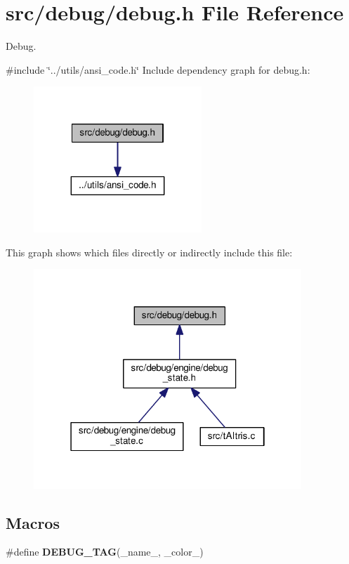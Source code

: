 \section{src/debug/debug.h File Reference}
\label{debug_8h}


Debug.  


{\ttfamily \#include \char`\"{}../utils/ansi\+\_\+code.\+h\char`\"{}}\newline
Include dependency graph for debug.\+h\+:
\nopagebreak
\begin{figure}[H]
\begin{center}
\leavevmode
\includegraphics[width=179pt]{debug_8h__incl}
\end{center}
\end{figure}
This graph shows which files directly or indirectly include this file\+:
\nopagebreak
\begin{figure}[H]
\begin{center}
\leavevmode
\includegraphics[width=286pt]{debug_8h__dep__incl}
\end{center}
\end{figure}
\subsection*{Macros}
\begin{DoxyCompactItemize}
\item 
\#define \textbf{ D\+E\+B\+U\+G\+\_\+\+T\+AG}(\+\_\+name\+\_\+,  \+\_\+color\+\_\+)
\end{DoxyCompactItemize}


